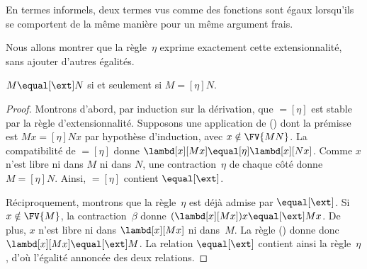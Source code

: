 \documentclass[../../../include/open-logic-section]{subfiles}
\begin{document}
En termes informels, deux termes vus comme
des fonctions sont égaux lorsqu'ils se
comportent de la même manière pour un même
argument frais.

Nous allons montrer que la règle~$\eta$
exprime exactement cette extensionnalité,
sans ajouter d'autres égalités.

\begin{thm}
$M \equal[\ext] N$ si et seulement si
$M \equal[\eta] N$.
\end{thm}

\begin{proof}
Montrons d'abord, par induction sur la
dérivation, que $\equal[\eta]$ est stable
par la règle d'extensionnalité. Supposons
une application de (\ext) dont la prémisse
est $Mx \equal[\eta] Nx$ par hypothèse
d'induction, avec $x \notin \FV{MN}$.
La compatibilité de $\equal[\eta]$ donne
$\lambd[x][Mx] \equal[\eta]
\lambd[x][Nx]$. Comme $x$ n'est libre
ni dans $M$ ni dans $N$, une contraction~$\eta$
de chaque côté donne $M \equal[\eta] N$.
Ainsi, $\equal[\eta]$ contient
$\equal[\ext]$.

Réciproquement, montrons que la règle~$\eta$
est déjà admise par $\equal[\ext]$.
Si $x \notin \FV{M}$, la contraction~$\beta$
donne $(\lambd[x][Mx])x \equal[\ext] Mx$.
De plus, $x$ n'est libre ni dans
$\lambd[x][Mx]$ ni dans~$M$. La règle (\ext)
donne donc $\lambd[x][Mx] \equal[\ext] M$.
La relation $\equal[\ext]$ contient ainsi
la règle~$\eta$, d'où l'égalité annoncée
des deux relations.
\end{proof}
\end{document}
